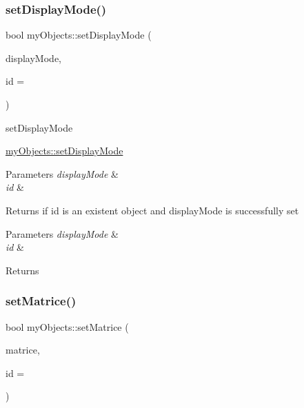 \subsubsection{\texorpdfstring{set\+Display\+Mode()}{setDisplayMode()}}
{\footnotesize\ttfamily bool my\+Objects\+::set\+Display\+Mode (\begin{DoxyParamCaption}\item[{int}]{display\+Mode,  }\item[{uint}]{id = {} }\end{DoxyParamCaption})}



set\+Display\+Mode 

\hyperlink{classmyObjects_a031a16bfe7b2bfdbf8207cd76cbf9ffd}{my\+Objects\+::set\+Display\+Mode}


\begin{DoxyParams}{Parameters}
{\em display\+Mode} & \\
\hline
{\em id} & \\
\hline
\end{DoxyParams}
\begin{DoxyReturn}{Returns}
if id is an existent object and display\+Mode is successfully set
\end{DoxyReturn}

\begin{DoxyParams}{Parameters}
{\em display\+Mode} & \\
\hline
{\em id} & \\
\hline
\end{DoxyParams}
\begin{DoxyReturn}{Returns}

\end{DoxyReturn}
\mbox{\label{classmyObjects_a9100b324aa8e47f94de10c66aaa606b1}} 
\subsubsection{\texorpdfstring{set\+Matrice()}{setMatrice()}}
{\footnotesize\ttfamily bool my\+Objects\+::set\+Matrice (\begin{DoxyParamCaption}\item[{Q\+Matrix4x4}]{matrice,  }\item[{uint}]{id = {} }\end{DoxyParamCaption})}



